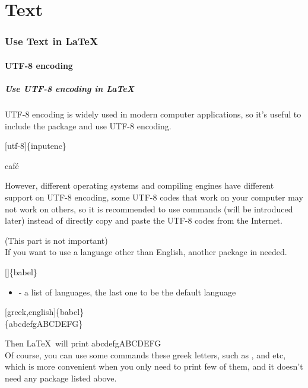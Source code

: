 \part{Text}

\section{Use Text in \LaTeX}
\begin{frame}
\end{frame}

\subsection{UTF-8 encoding}

\begin{frame}
	\frametitle{Use UTF-8 encoding in \LaTeX}
	UTF-8 encoding is widely used in modern computer applications, so it's useful to include the  package and use UTF-8 encoding.
	\begin{command}
		[utf-8]\{inputenc\}
	\end{command}
	\begin{example}
		café
	\end{example}
	However, different operating systems and compiling engines have different support on UTF-8 encoding, some UTF-8 codes that work on your computer may not work on others, so it is recommended to use commands (will be introduced later) instead of directly copy and paste the UTF-8 codes from the Internet.
\end{frame}

\begin{frame}
	(This part is not important)\\
	If you want to use a language other than English, another package  in needed.
	\begin{command}
		[]\{babel\}
		\begin{itemize}
			\item {} - a list of languages, the last one to be the default language
		\end{itemize}
	\end{command}
	\begin{example}
		[greek,english]\{babel\}\\
		\{abcdefgABCDEFG\}\\
	\end{example}
	Then \LaTeX\ will print \textgreek{abcdefgABCDEFG}\\
	Of course, you can use some commands these greek letters, such as ,  and etc, which is more convenient when you only need to print few of them, and it doesn't need any package listed above.
\end{frame}

